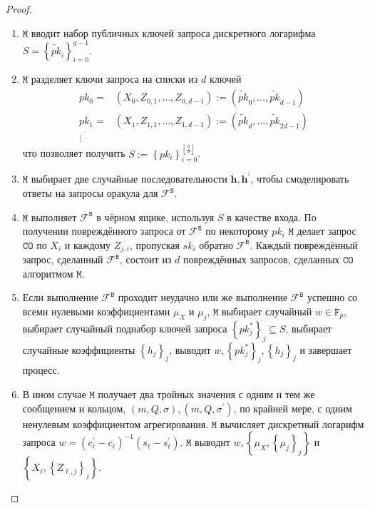 \documentclass{llncs}
\newcommand{\B}{\texttt{B}}
\newcommand{\F}{\texttt{F}_p}
\begin{document}
\begin{proof}
\begin{enumerate}[(1)]
\item $\texttt{M}$ вводит набор публичных ключей запроса дискретного логарифма $S = \left\{\widetilde{pk}_i\right\}_{i=0}^{q-1}$.

\item $\texttt{M}$ разделяет ключи запроса на списки из $d$ ключей
\begin{align*}
pk_0 =&  (X_0, Z_{0, 1}, \ldots, Z_{0, d-1}) := (\widetilde{pk}_0, \ldots, \widetilde{pk}_{d-1}) \\
pk_1 =& (X_1, Z_{1, 1}, \ldots, Z_{1, d-1}) := (\widetilde{pk}_d, \ldots, \widetilde{pk}_{2d-1}) \\
\vdots
\end{align*} что позволяет получить $S := \left\{pk_i\right\}_{i=0}^{\left\lfloor \frac{q}{d}\right\rfloor}$.

\item $\texttt{M}$ выбирает две случайные последовательности $\textbf{h}, \textbf{h}^\prime$, чтобы смоделировать ответы на запросы оракула для $\mathcal{F}^{\B}$.

\item $\texttt{M}$ выполняет $\mathcal{F}^{\B}$ в чёрном ящике, используя $S$ в качестве входа. По получении повреждённого запроса от $\mathcal{F}^{\B}$ по некоторому $pk_i$ $\texttt{M}$ делает запрос $\texttt{CO}$ по $X_i$ и каждому $Z_{j,i}$, пропуская $sk_i$ обратно $\mathcal{F}^{\B}$. Каждый повреждённый запрос, сделанный $\mathcal{F}^{\B}$, состоит из $d$ повреждённых запросов, сделанных $\texttt{CO}$ алгоритмом $\texttt{M}$.

\item Если выполнение $\mathcal{F}^{\B}$ проходит неудачно или же выполнение $\mathcal{F}^{\B}$ успешно со всеми нулевыми коэффициентами $\mu_X$ и $\mu_j$, $\texttt{M}$ выбирает случайный $w \in \F$, выбирает случайный поднабор ключей запроса $\left\{pk^*_j\right\}_j \subseteq S$, выбирает случайные коэффициенты $\left\{h_j\right\}_j$, выводит $w, \left\{pk^*_j\right\}_j, \left\{h_j\right\}_j$ и завершает процесс.

\item В ином случае $\texttt{M}$ получает два тройных значения с одним и тем же сообщением и кольцом, $(m, Q, \sigma), (m, Q, \sigma^\prime)$, по крайней мере, с одним ненулевым коэффициентом агрегирования. $\texttt{M}$ вычисляет дискретный логарифм запроса $w = (c_\ell^\prime - c_\ell)^{-1}(s_\ell - s_\ell^\prime)$. $\texttt{M}$ выводит $w, \left\{\mu_X, \left\{\mu_j\right\}_j\right\}$ и $\left\{X_\ell, \left\{Z_{\ell, j}\right\}_j\right\}$.
\end{enumerate}


\end{proof}
\end{document}
